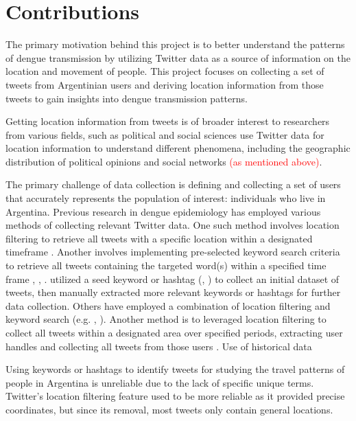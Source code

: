 \cite{pilipiec_surveillance_2023}

\section{Contributions}
The primary motivation behind this project is to better understand the patterns of dengue transmission by utilizing Twitter data as a source of information on the location and movement of people. This project focuses on collecting a set of tweets from Argentinian users and deriving location information from those tweets to gain insights into dengue transmission patterns.

Getting location information from tweets is of broader interest to researchers from various fields, such as political and social sciences use Twitter data for location information to understand different phenomena, including the geographic distribution of political opinions and social networks \textcolor{red}{(as mentioned above)}.

The primary challenge of data collection is defining and collecting a set of users that accurately represents the population of interest: individuals who live in Argentina. Previous research in dengue epidemiology has employed various methods of collecting relevant Twitter data.
One such method involves location filtering to retrieve all tweets with a specific location within a designated timeframe \cite{cebeillac_where_2017}.
Another involves implementing pre-selected keyword search criteria to retrieve all tweets containing the targeted word(s) within a specified time frame \cite{de_bruijn_taggs_2017}, \cite{gomide_dengue_2011}, .
utilized a seed keyword or hashtag (\cite{missier_tracking_2016}, \cite{paul_discovering_2014}) to collect an initial dataset of tweets, then manually extracted more relevant keywords or hashtags for further data collection.
Others have employed a combination of location filtering and keyword search (e.g. \cite{albinati_enhancement_2017}, \cite{saire_building_2019}).
Another method is to leveraged location filtering to collect all tweets within a designated area over specified periods, extracting user handles and collecting all tweets from those users \cite{coberly_tweeting_2014}.
Use of historical data \cite{gomide_dengue_2011}

Using keywords or hashtags to identify tweets for studying the travel patterns of people in Argentina is unreliable due to the lack of specific unique terms. Twitter's location filtering feature used to be more reliable as it provided precise coordinates, but since its removal, most tweets only contain general locations.

